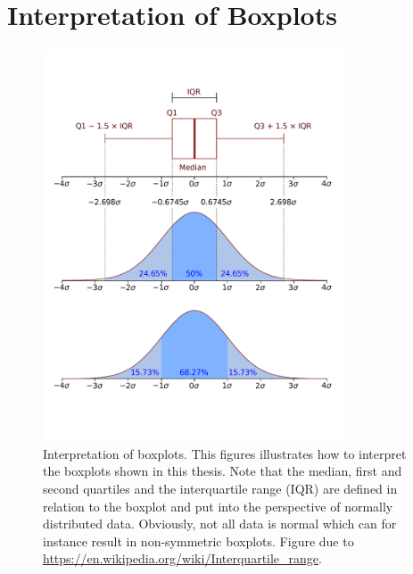 
\chapter{Interpretation of Boxplots}\label{app: Appendix: Boxplot interpretation}

\begin{figure}[H]
    \centering
    \includegraphics[width=0.8\textwidth]{graphics/boxplot/Boxplot_vs_PDF.pdf}
    \caption{
        Interpretation of boxplots. This figures illustrates how to interpret the boxplots shown in this thesis. Note that the median, first and second quartiles and the interquartile range (IQR) are defined in relation to the boxplot and put into the perspective of normally distributed data. Obviously, not all data is normal which can for instance result in non-symmetric boxplots. Figure due to \url{https://en.wikipedia.org/wiki/Interquartile_range}.
    }
    \label{fig: Appendix: boxplot interpretation}
\end{figure}
